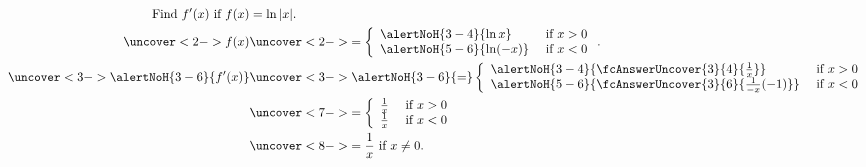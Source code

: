 \begin{frame}
\begin{example}
\abovedisplayskip=0pt
\belowdisplayskip=0pt
\abovedisplayshortskip=0pt
\belowdisplayshortskip=0pt
\begin{align*}
\text{Find $f'(x)$ if } f(x) & = \ln |x|.\\
\uncover<2->{%
f(x) %
}%
& \uncover<2->{
 = \left\{ \begin{array}{lr}
\alertNoH{ 3-4}{\ln x} & \text{ if } x > 0 \\
\alertNoH{ 5-6}{\ln (-x)} & \text{ if } x < 0 \\
\end{array}\right. .
}\\%
\uncover<3->{%
\alertNoH{3-6}{f'(x)} %
}%
& \uncover<3->{
\alertNoH{3-6}{ =} \left\{ \begin{array}{lr}
\alertNoH{ 3-4}{\fcAnswerUncover{3}{4}{\frac{1}{x}}} & \text{ if } x > 0 \\
\alertNoH{ 5-6}{\fcAnswerUncover{3}{6}{\frac{1}{-x}(-1)}} & \text{ if } x < 0 \\
\end{array}\right.
}\\%
& \uncover<7->{
 = \left\{ \begin{array}{lr}
\frac{1}{x} & \text{ if } x > 0 \\
\frac{1}{x} & \text{ if } x < 0 \\
\end{array}\right.
}\\%
& \uncover<8->{%
 = \frac{1}{x} \text{ if } x \neq 0.
}%
\end{align*}
\end{example}
\end{frame}
